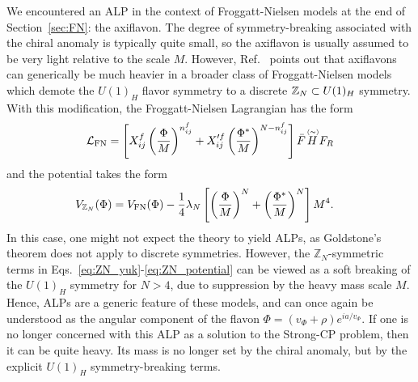{We encountered an ALP in the context of Froggatt-Nielsen models at the end of Section~\ref{sec:FN}: the axiflavon. The degree of symmetry-breaking associated with the chiral anomaly is typically quite small, so the axiflavon is usually assumed to be very light relative to the scale $M$. However, Ref.~\cite{Greljo:2024evt} points out that axiflavons can generically be much heavier in a broader class of Froggatt-Nielsen models which demote the $U(1)_H$ flavor symmetry to a discrete ${\Bbb Z}_N\subset U(1)_H$ symmetry. With this modification, the Froggatt-Nielsen Lagrangian has the form
\begin{align}
    {\cal L}_{\rm FN} = \left[X^f_{ij}\left(\frac{\Phi}{M}\right)^{n_{ij}^f}+X^{\prime f}_{ij}\left(\frac{\Phi^*}{M}\right)^{N - n_{ij}^f}\right]\bar{F}\overset{\tiny{\scriptscriptstyle \, (\sim)}}{H}F_R \label{eq:ZN_yuk}
\end{align}
and the potential takes the form
\begin{align}
    V_{{\mathbb Z}_N}(\Phi) &= V_{\rm FN}(\Phi) - \frac{1}{4}\lambda_N\left[\left(\frac{\Phi}{M}\right)^N + \left(\frac{\Phi^*}{M}\right)^N\right]M^4. \label{eq:ZN_potential}
\end{align}
In this case, one might not expect the theory to yield ALPs, as Goldstone's theorem does not apply to discrete symmetries. However, the ${\mathbb Z}_N$-symmetric terms in Eqs.~\ref{eq:ZN_yuk}-\ref{eq:ZN_potential} can be viewed as a soft breaking of the $U(1)_H$ symmetry for $N > 4$, due to suppression by the heavy mass scale $M$. Hence, ALPs are a generic feature of these models, and can once again be understood as the angular component of the flavon $\Phi = (v_\Phi + \rho) e^{ia/v_\Phi}$. If one is no longer concerned with this ALP as a solution to the Strong-CP problem, then it can be quite heavy. Its mass is no longer set by the chiral anomaly, but by the explicit $U(1)_H$ symmetry-breaking terms.

}
